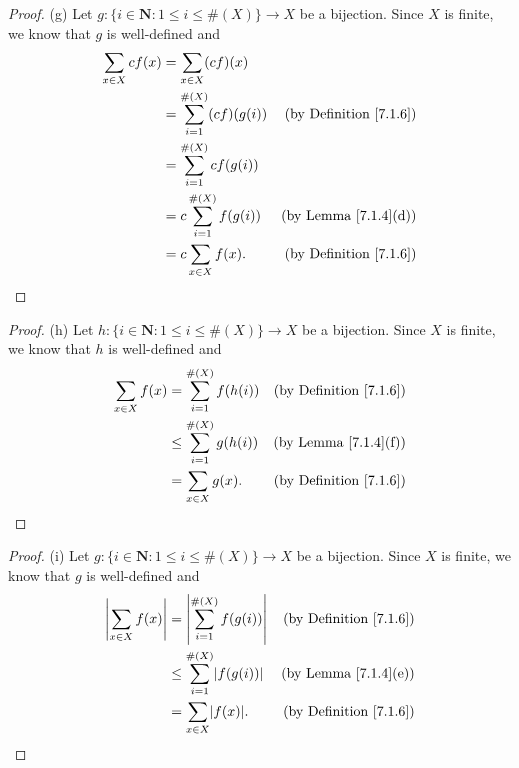 \begin{proof}{(g)}
    Let \(g : \{i \in \mathbf{N} : 1 \leq i \leq \#(X)\} \to X\) be a bijection.
    Since \(X\) is finite, we know that \(g\) is well-defined and
    \begin{align*}
        \sum_{x \in X} cf(x) & = \sum_{x \in X} (cf)(x)                                               \\
                             & = \sum_{i = 1}^{\#(X)} (cf)(g(i)) & \text{(by Definition \ref{7.1.6})} \\
                             & = \sum_{i = 1}^{\#(X)} cf(g(i))                                        \\
                             & = c \sum_{i = 1}^{\#(X)} f(g(i))  & \text{(by Lemma \ref{7.1.4}(d))}   \\
                             & = c \sum_{x \in X} f(x).          & \text{(by Definition \ref{7.1.6})}
    \end{align*}
\end{proof}

\begin{proof}{(h)}
    Let \(h : \{i \in \mathbf{N} : 1 \leq i \leq \#(X)\} \to X\) be a bijection.
    Since \(X\) is finite, we know that \(h\) is well-defined and
    \begin{align*}
        \sum_{x \in X} f(x) & = \sum_{i = 1}^{\#(X)} f(h(i))    & \text{(by Definition \ref{7.1.6})} \\
                            & \leq \sum_{i = 1}^{\#(X)} g(h(i)) & \text{(by Lemma \ref{7.1.4}(f))}   \\
                            & = \sum_{x \in X} g(x).            & \text{(by Definition \ref{7.1.6})}
    \end{align*}
\end{proof}

\begin{proof}{(i)}
    Let \(g : \{i \in \mathbf{N} : 1 \leq i \leq \#(X)\} \to X\) be a bijection.
    Since \(X\) is finite, we know that \(g\) is well-defined and
    \begin{align*}
        \abs*{\sum_{x \in X} f(x)} & = \abs*{\sum_{i = 1}^{\#(X)} f(g(i))}    & \text{(by Definition \ref{7.1.6})} \\
                                   & \leq \sum_{i = 1}^{\#(X)} \abs*{f(g(i))} & \text{(by Lemma \ref{7.1.4}(e))}   \\
                                   & = \sum_{x \in X} \abs*{f(x)}.            & \text{(by Definition \ref{7.1.6})}
    \end{align*}
\end{proof}

